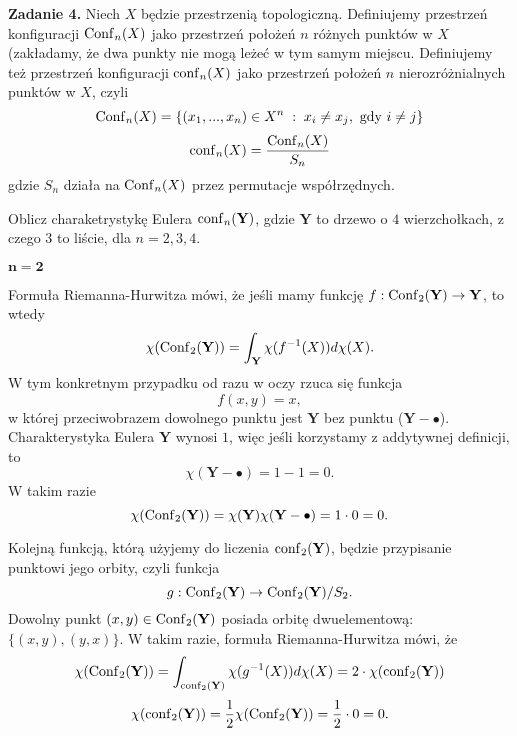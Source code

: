 \textbf{\large\color{orange}Zadanie 4.} Niech $X$ będzie przestrzenią topologiczną. Definiujemy przestrzeń konfiguracji $\operatorname{Conf}_n(X)$ jako przestrzeń położeń $n$ różnych punktów w $X$ (zakładamy, że dwa punkty nie mogą leżeć w tym samym miejscu. Definiujemy też przestrzeń konfiguracji $\operatorname{conf}_n(X)$ jako przestrzeń położeń $n$ nierozróżnialnych punktów w $X$, czyli
$$\operatorname{Conf}_n(X)=\{(x_1,...,x_n)\in X^n\;:\;x_i\neq x_j, \text{ gdy }i\neq j\}$$
$$\operatorname{conf}_n(X)=\frac{\operatorname{Conf}_n(X)}{S_n}$$
gdzie $S_n$ działa na $\operatorname{Conf}_n(X)$ przez permutacje współrzędnych.

Oblicz charaketrystykę Eulera $\operatorname{conf}_n(\mathbf{Y})$, gdzie $\mathbf{Y}$ to drzewo o $4$ wierzchołkach, z czego $3$ to liście, dla $n=2,3,4$.

\dotfill

\textbf{$\mathbf{n=2}$}


Formuła Riemanna-Hurwitza mówi, że jeśli mamy funkcję $f:\operatorname{Conf}_2(\mathbf{Y})\to \mathbf{Y}$, to wtedy
$$\chi(\operatorname{Conf}_2(\mathbf{Y}))=\int_{\mathbf{Y}}\chi(f^{-1}(X))d\chi(X).$$
W tym konkretnym przypadku od razu w oczy rzuca się funkcja
$$f(x, y)=x,$$
w której przeciwobrazem dowolnego punktu jest $\mathbf{Y}$ bez punktu ($\mathbf{Y}-\bullet$). Charakterystyka Eulera $\mathbf{Y}$ wynosi $1$, więc jeśli korzystamy z addytywnej definicji, to 
$$\chi(\mathbf{Y}-\bullet)=1-1=0.$$
W takim razie 
$$\chi(\operatorname{Conf}_2(\mathbf{Y}))=\chi(\mathbf{Y})\chi(\mathbf{Y}-\bullet)=1\cdot 0=0.$$


Kolejną funkcją, którą użyjemy do liczenia $\operatorname{conf}_2(\mathbf{Y})$, będzie przypisanie punktowi jego orbity, czyli funkcja
$$g:\operatorname{Conf}_2(\mathbf{Y})\to \operatorname{Conf}_2(\mathbf{Y})/S_2.$$
Dowolny punkt $(x, y)\in \operatorname{Conf}_2(\mathbf{Y})$ posiada orbitę dwuelementową: $\{(x, y), (y, x)\}$. W takim razie, formuła Riemanna-Hurwitza mówi, że
$$\chi(\operatorname{Conf}_2(\mathbf{Y}))=\int_{\operatorname{conf}_2(\mathbf{Y})}\chi(g^{-1}(X))d\chi(X)=2\cdot\chi(\operatorname{conf}_2(\mathbf{Y}))$$
$$\chi(\operatorname{conf}_2(\mathbf{Y}))=\frac{1}{2}\chi(\operatorname{Conf}_2(\mathbf{Y}))=\frac{1}{2}\cdot 0=0.$$

